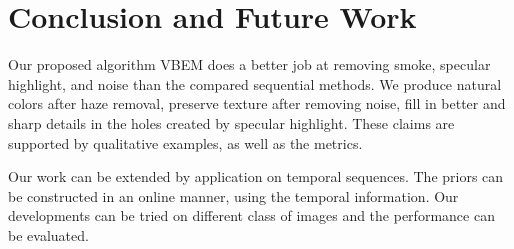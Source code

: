 \chapter{Conclusion and Future Work}

Our proposed algorithm VBEM does a better job at removing smoke, specular highlight, and noise than the compared sequential methods. We produce natural colors after haze removal, preserve texture after removing noise, fill in better and sharp details in the holes created by specular highlight. These claims are supported by qualitative examples, as well as the metrics.

Our work can be extended by application on temporal sequences. The priors can be constructed in an online manner, using the temporal information. Our developments can be tried on different class of images and the performance can be evaluated. 